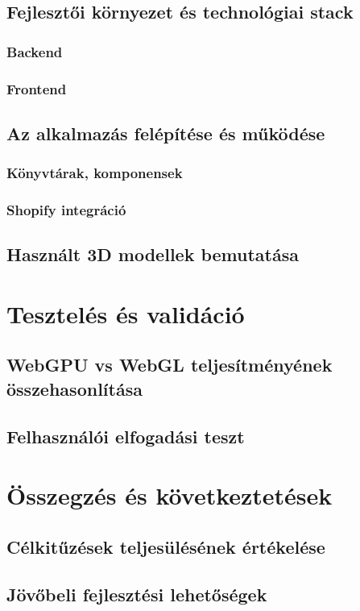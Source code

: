 \documentclass[12pt]{report}
\begin{document}
        \section{Fejlesztői környezet és technológiai stack}
        \subsection{Backend}
        \subsection{Frontend}
        \section{Az alkalmazás felépítése és működése}
        \subsection{Könyvtárak, komponensek}
        \subsection{Shopify integráció}
        \section{Használt 3D modellek bemutatása}
        
        \chapter{Tesztelés és validáció}
        \section{WebGPU vs WebGL teljesítményének összehasonlítása}
        \section{Felhasználói elfogadási teszt}
        
        \chapter{Összegzés és következtetések}
        \section{Célkitűzések teljesülésének értékelése}
        \section{Jövőbeli fejlesztési lehetőségek}
\end{document}
